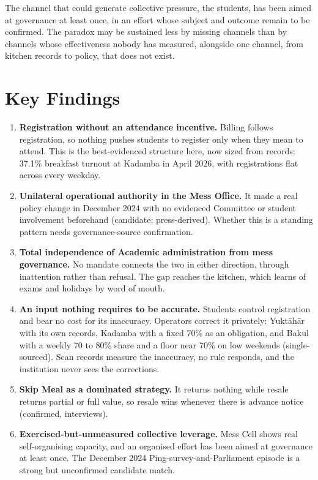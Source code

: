 \documentclass[
  10pt,
  table]{article}
\providecommand{\tightlist}{%
  \setlength{\itemsep}{0pt}\setlength{\parskip}{0pt}}
\renewcommand{\tightlist}{\setlength{\itemsep}{1.5pt}\setlength{\parskip}{0pt}}
\begin{document}
The channel that could generate collective pressure, the students, has been aimed at governance at least once, in an effort whose subject and outcome remain to be confirmed. The paradox may be sustained less by missing channels than by channels whose effectiveness nobody has measured, alongside one channel, from kitchen records to policy, that does not exist.

\section{Key Findings}\label{key-findings}

\begin{enumerate}
\def\labelenumi{\arabic{enumi}.}
\tightlist
\item
  \textbf{Registration without an attendance incentive.} Billing follows registration, so nothing pushes students to register only when they mean to attend. This is the best-evidenced structure here, now sized from records: 37.1\% breakfast turnout at Kadamba in April 2026, with registrations flat across every weekday.
\item
  \textbf{Unilateral operational authority in the Mess Office.} It made a real policy change in December 2024 with no evidenced Committee or student involvement beforehand (candidate; press-derived). Whether this is a standing pattern needs governance-source confirmation.
\item
  \textbf{Total independence of Academic administration from mess governance.} No mandate connects the two in either direction, through inattention rather than refusal. The gap reaches the kitchen, which learns of exams and holidays by word of mouth.
\item
  \textbf{An input nothing requires to be accurate.} Students control registration and bear no cost for its inaccuracy. Operators correct it privately: Yuktāhār with its own records, Kadamba with a fixed 70\% as an obligation, and Bakul with a weekly 70 to 80\% share and a floor near 70\% on low weekends (single-sourced). Scan records measure the inaccuracy, no rule responds, and the institution never sees the corrections.
\item
  \textbf{Skip Meal as a dominated strategy.} It returns nothing while resale returns partial or full value, so resale wins whenever there is advance notice (confirmed, interviews).
\item
  \textbf{Exercised-but-unmeasured collective leverage.} Mess Cell shows real self-organising capacity, and an organised effort has been aimed at governance at least once. The December 2024 Ping-survey-and-Parliament episode is a strong but unconfirmed candidate match.

\end{enumerate}
\end{document}
